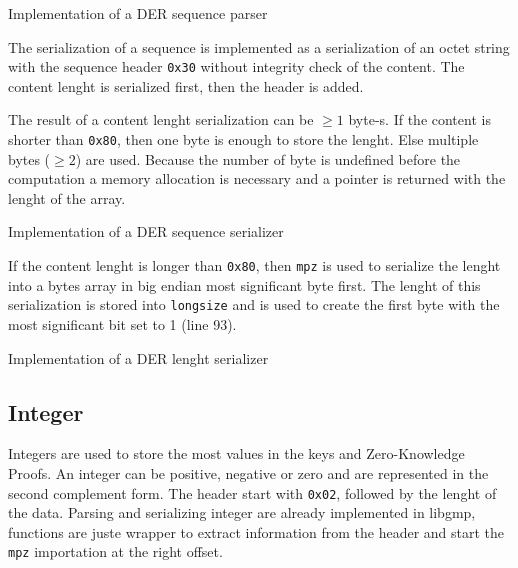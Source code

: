 \begin{listing}
	\caption{Implementation of a DER sequence parser}
	\label{lst:implDERSequenceParser}
\end{listing}

The serialization of a sequence is implemented as a serialization of an octet string
with the sequence header \texttt{0x30} without integrity check of the content.
The content lenght is serialized first, then the header is added.

The result of a content lenght serialization can be $\geq 1$ byte-s. If the content
is shorter than \texttt{0x80}, then one byte is enough to store the lenght. Else
multiple bytes ($\geq 2$) are used. Because the number of byte is undefined before
the computation a memory allocation is necessary and a pointer is returned with
the lenght of the array.

\begin{listing}
	\caption{Implementation of a DER sequence serializer}
	\label{lst:implDERSequenceSerializer}
\end{listing}

If the content lenght is longer than \texttt{0x80}, then \texttt{mpz} is used to serialize
the lenght into a bytes array in big endian most significant byte first. The lenght
of this serialization is stored into \texttt{longsize} and is used to create the
first byte with the most significant bit set to 1 (line 93).

\begin{listing}
	\caption{Implementation of a DER lenght serializer}
	\label{lst:implDERLenghtSerializer}
\end{listing}

\subsection{Integer}

Integers are used to store the most values in the keys and Zero-Knowledge Proofs.
An integer can be positive, negative or zero and are represented in the second
complement form. The header start with \texttt{0x02}, followed by the lenght of the data.
Parsing and serializing integer are already implemented in libgmp, functions are
juste wrapper to extract information from the header and start the \texttt{mpz}
importation at the right offset.

